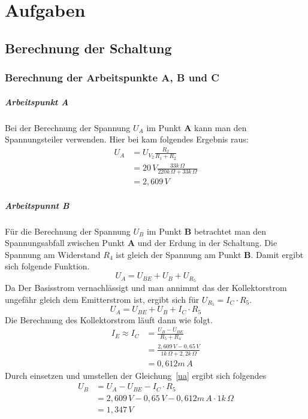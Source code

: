 \chapter{Aufgaben}
    \section{Berechnung der Schaltung}
        \subsection{Berechnung der Arbeitspunkte A, B und C}
            \paragraph{Arbeitspunkt A} Bei der Berechnung der Spannung \(U_A\) im Punkt \textbf{A} kann man den Spannungsteiler verwenden.
            Hier bei kam folgendes Ergebnis raus: 
            \begin{align*}
                U_A & = U_{V_2}\frac{R_2}{R_1+R_2} \\
                 & = 20\,V\frac{33k\,\Omega }{220k\,\Omega+33k\,\Omega}\\
                 & = 2,609\,V
            \end{align*}
            \paragraph{Arbeitspunnt B} Für die Berechnung der Spannung \(U_B\) im Punkt \textbf{B} betrachtet man den Spannungsabfall zwischen Punkt \textbf{A} und der Erdung in der Schaltung.
            Die Spannung am Widerstand \(R_4\) ist gleich der Spannung am Punkt \textbf{B}. Damit ergibt sich folgende Funktion.
            \begin{equation*}
                U_A = U_{BE} + U_B + U_{R_5}
            \end{equation*}
            Da Der Basisstrom vernachlässigt und man annimmt das der Kollektorstrom ungefähr gleich dem Emitterstrom ist, ergibt sich für \(U_{R_5} = I_C \cdot R_5\).
            \begin{equation}
                \label{ua}
                U_A = U_{BE} + U_B + I_C \cdot R_5
            \end{equation}
            Die Berechnung des Kollektorstrom läuft dann wie folgt. 
            \begin{align*}
                I_E\approx I_C & = \frac{U_B-U_{BE}}{R_5+R_4}\\
                &=\frac{2,609\,V-0,65\,V}{1k\,\Omega +2,2k\,\Omega}\\
                &=0,612m \,A
            \end{align*}
            Durch einsetzen und umstellen der Gleichung~\ref{ua} ergibt sich folgendes
            \begin{align*}
                U_B & = U_A-U_{BE}-I_C\cdot R_5\\
                & = 2,609\,V-0,65\,V-0,612m\,A\cdot 1k\,\Omega\\
                & = 1,347\,V
            \end{align*}
